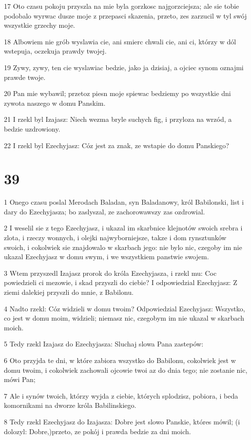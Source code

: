 \par 17 Oto czasu pokoju przyszla na mie byla gorzkosc najgorzciejsza; ale sie tobie podobalo wyrwac dusze moje z przepasci skazenia, przeto, zes zarzucil w tyl swój wszystkie grzechy moje.
\par 18 Albowiem nie grób wyslawia cie, ani smierc chwali cie, ani ci, którzy w dól wstepuja, oczekuja prawdy twojej.
\par 19 Zywy, zywy, ten cie wyslawiac bedzie, jako ja dzisiaj, a ojciec synom oznajmi prawde twoje.
\par 20 Pan mie wybawil; przetoz piesn moje spiewac bedziemy po wszystkie dni zywota naszego w domu Panskim.
\par 21 I rzekl byl Izajasz: Niech wezma bryle suchych fig, i przyloza na wrzód, a bedzie uzdrowiony.
\par 22 I rzekl byl Ezechyjasz: Cóz jest za znak, ze wstapie do domu Panskiego?

\chapter{39}

\par 1 Onego czasu poslal Merodach Baladan, syn Baladanowy, król Babilonski, list i dary do Ezechyjasza; bo zaslyszal, ze zachorowawszy zas ozdrowial.
\par 2 I weselil sie z tego Ezechyjasz, i ukazal im skarbnice klejnotów swoich srebra i zlota, i rzeczy wonnych, i olejki najwyborniejsze, takze i dom rynsztunków swoich, i cokolwiek sie znajdowalo w skarbach jego: nie bylo nic, czegoby im nie ukazal Ezechyjasz w domu swym, i we wszystkiem panstwie swojem.
\par 3 Wtem przyszedl Izajasz prorok do króla Ezechyjasza, i rzekl mu: Coc powiedzieli ci mezowie, i skad przyszli do ciebie? I odpowiedzial Ezechyjasz: Z ziemi dalekiej przyszli do mnie, z Babilonu.
\par 4 Nadto rzekl: Cóz widzieli w domu twoim? Odpowiedzial Ezechyjasz: Wszystko, co jest w domu moim, widzieli; niemasz nic, czegobym im nie ukazal w skarbach moich.
\par 5 Tedy rzekl Izajasz do Ezechyjasza: Sluchaj slowa Pana zastepów:
\par 6 Oto przyjda te dni, w które zabiora wszystko do Babilonu, cokolwiek jest w domu twoim, i cokolwiek zachowali ojcowie twoi az do dnia tego; nie zostanie nic, mówi Pan;
\par 7 Ale i synów twoich, którzy wyjda z ciebie, których splodzisz, pobiora, i beda komornikami na dworze króla Babilinskiego.
\par 8 Tedy rzekl Ezechyjasz do Izajasza: Dobre jest slowo Panskie, któres mówil; (i dolozyl: Dobre,)przeto, ze pokój i prawda bedzie za dni moich.

